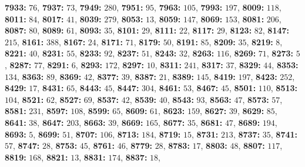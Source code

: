 \textsf{\bfseries 7933:} $76$, \textsf{\bfseries 7937:} $73$, \textsf{\bfseries 7949:} $280$, \textsf{\bfseries 7951:} $95$, \textsf{\bfseries 7963:} $105$, \textsf{\bfseries 7993:} $197$, \textsf{\bfseries 8009:} $118$, \textsf{\bfseries 8011:} $84$, \textsf{\bfseries 8017:} $41$, \textsf{\bfseries 8039:} $279$, \textsf{\bfseries 8053:} $13$, \textsf{\bfseries 8059:} $147$, \textsf{\bfseries 8069:} $153$, \textsf{\bfseries 8081:} $206$, \textsf{\bfseries 8087:} $80$, \textsf{\bfseries 8089:} $61$, \textsf{\bfseries 8093:} $35$, \textsf{\bfseries 8101:} $29$, \textsf{\bfseries 8111:} $22$, \textsf{\bfseries 8117:} $29$, \textsf{\bfseries 8123:} $82$, \textsf{\bfseries 8147:} $215$, \textsf{\bfseries 8161:} $388$, \textsf{\bfseries 8167:} $24$, \textsf{\bfseries 8171:} $71$, \textsf{\bfseries 8179:} $50$, \textsf{\bfseries 8191:} $85$, \textsf{\bfseries 8209:} $35$, \textsf{\bfseries 8219:} $8$, \textsf{\bfseries 8221:} $40$, \textsf{\bfseries 8231:} $55$, \textsf{\bfseries 8233:} $92$, \textsf{\bfseries 8237:} $51$, \textsf{\bfseries 8243:} $32$, \textsf{\bfseries 8263:} $116$, \textsf{\bfseries 8269:} $71$, \textsf{\bfseries 8273:} $5$, \textsf{\bfseries 8287:} $77$, \textsf{\bfseries 8291:} $6$, \textsf{\bfseries 8293:} $172$, \textsf{\bfseries 8297:} $10$, \textsf{\bfseries 8311:} $241$, \textsf{\bfseries 8317:} $37$, \textsf{\bfseries 8329:} $44$, \textsf{\bfseries 8353:} $134$, \textsf{\bfseries 8363:} $89$, \textsf{\bfseries 8369:} $42$, \textsf{\bfseries 8377:} $39$, \textsf{\bfseries 8387:} $21$, \textsf{\bfseries 8389:} $145$, \textsf{\bfseries 8419:} $197$, \textsf{\bfseries 8423:} $252$, \textsf{\bfseries 8429:} $17$, \textsf{\bfseries 8431:} $65$, \textsf{\bfseries 8443:} $45$, \textsf{\bfseries 8447:} $304$, \textsf{\bfseries 8461:} $53$, \textsf{\bfseries 8467:} $45$, \textsf{\bfseries 8501:} $110$, \textsf{\bfseries 8513:} $104$, \textsf{\bfseries 8521:} $62$, \textsf{\bfseries 8527:} $69$, \textsf{\bfseries 8537:} $42$, \textsf{\bfseries 8539:} $40$, \textsf{\bfseries 8543:} $93$, \textsf{\bfseries 8563:} $47$, \textsf{\bfseries 8573:} $57$, \textsf{\bfseries 8581:} $231$, \textsf{\bfseries 8597:} $108$, \textsf{\bfseries 8599:} $65$, \textsf{\bfseries 8609:} $61$, \textsf{\bfseries 8623:} $159$, \textsf{\bfseries 8627:} $39$, \textsf{\bfseries 8629:} $85$, \textsf{\bfseries 8641:} $38$, \textsf{\bfseries 8647:} $203$, \textsf{\bfseries 8663:} $39$, \textsf{\bfseries 8669:} $165$, \textsf{\bfseries 8677:} $35$, \textsf{\bfseries 8681:} $47$, \textsf{\bfseries 8689:} $194$, \textsf{\bfseries 8693:} $5$, \textsf{\bfseries 8699:} $51$, \textsf{\bfseries 8707:} $106$, \textsf{\bfseries 8713:} $184$, \textsf{\bfseries 8719:} $15$, \textsf{\bfseries 8731:} $213$, \textsf{\bfseries 8737:} $35$, \textsf{\bfseries 8741:} $57$, \textsf{\bfseries 8747:} $28$, \textsf{\bfseries 8753:} $45$, \textsf{\bfseries 8761:} $46$, \textsf{\bfseries 8779:} $28$, \textsf{\bfseries 8783:} $17$, \textsf{\bfseries 8803:} $48$, \textsf{\bfseries 8807:} $117$, \textsf{\bfseries 8819:} $168$, \textsf{\bfseries 8821:} $13$, \textsf{\bfseries 8831:} $174$, \textsf{\bfseries 8837:} $18$, 

